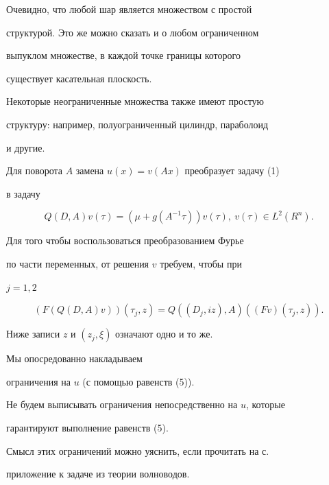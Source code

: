 Очевидно, что любой шар является множеством с простой


структурой. Это же можно сказать и о любом ограниченном


выпуклом множестве, в каждой точке границы которого


существует касательная плоскость. 


Некоторые неограниченные множества также имеют простую


структуру: например, полуограниченный цилиндр, параболоид


и другие. 





Для поворота $A$ замена $u(x)=v(Ax)$ преобразует задачу (1)


в задачу


\begin{equation}


Q(D, A)v(\tau)=(\mu +g(A^{-1} \tau)) v(\tau), \ v(\tau) \in


L^{2}(R^{n}). 


\end{equation}


Для того чтобы воспользоваться преобразованием Фурье


по части переменных, от решения $v$ требуем, чтобы при


$j=1, 2$


\begin{equation}


(F(Q(D, A)v))(\tau_{j}, z)= Q((D_{j}, iz), A)((Fv)(\tau_{j}, z)). 


\end{equation}


Ниже записи $z$ и $(z_{j}, \xi)$ означают одно и то же. 





\begin{note}


Мы опосредованно накладываем


ограничения на $u$ (с помощью равенств (5)). 


Не будем выписывать ограничения непосредственно на $u$, которые


гарантируют выполнение равенств (5).


Смысл этих ограничений можно уяснить, если прочитать на с.\,\pageref{WG}


приложение к задаче из теории волноводов.


\end{note}





